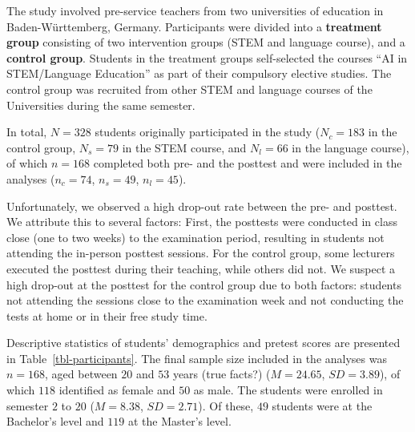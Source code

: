 \documentclass[
  letterpaper,
  DIV=11,
  numbers=noendperiod]{scrartcl}
\begin{document}
The study involved pre-service teachers from two universities of
education in Baden-Württemberg, Germany. Participants were divided into
a \textbf{treatment group} consisting of two intervention groups (STEM
and language course), and a \textbf{control group}. Students in the
treatment groups self-selected the courses ``AI in STEM/Language
Education'' as part of their compulsory elective studies. The control
group was recruited from other STEM and language courses of the
Universities during the same semester.

In total, \(N=328\) students originally participated in the study
(\(N_c=183\) in the control group, \(N_s= 79\) in the STEM course, and
\(N_l=66\) in the language course), of which \(n=168\) completed both
pre- and the posttest and were included in the analyses (\(n_c = 74\),
\(n_s = 49\), \(n_l = 45\)).

Unfortunately, we observed a high drop-out rate between the pre- and
posttest. We attribute this to several factors: First, the posttests
were conducted in class close (one to two weeks) to the examination
period, resulting in students not attending the in-person posttest
sessions. For the control group, some lecturers executed the posttest
during their teaching, while others did not. We suspect a high drop-out
at the posttest for the control group due to both factors: students not
attending the sessions close to the examination week and not conducting
the tests at home or in their free study time.

Descriptive statistics of students' demographics and pretest scores are
presented in Table~\ref{tbl-participants}. The final sample size
included in the analyses was \(n=168\), aged between \(20\) and \(53\)
years (true facts?) (\(M=24.65\), \(SD=3.89\)), of which \(118\)
identified as female and \(50\) as male. The students were enrolled in
semester \(2\) to \(20\) (\(M=8.38\), \(SD=2.71\)). Of these, \(49\)
students were at the Bachelor's level and \(119\) at the Master's level.
\end{document}
